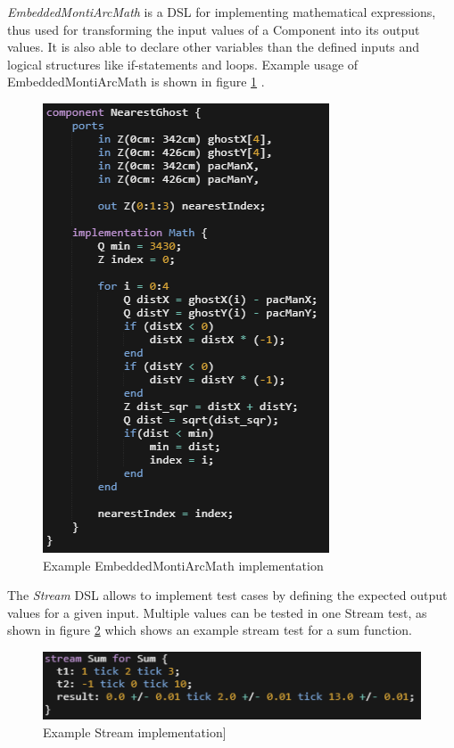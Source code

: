 \emph{EmbeddedMontiArcMath} is a DSL for implementing mathematical expressions, thus used for transforming the input values of a Component into its output values. It is also able to declare other variables than the defined inputs and logical structures like if-statements and loops. Example usage of EmbeddedMontiArcMath is shown in figure \ref{fig:EMontiArcMath} .

\begin{figure}[!h]
	\centering
	\includegraphics[scale=0.55]{pictures/EMAMath.PNG}
	\caption{Example EmbeddedMontiArcMath implementation}
	\label{fig:EMontiArcMath}
\end{figure}

The \emph{Stream} DSL allows to implement test cases by defining the expected output values for a given input. Multiple values can be tested in one Stream test, as shown in figure \ref{fig:EMAStream} which shows an example stream test for a sum function.

\begin{figure}[!h]
	\centering
	\includegraphics[scale=0.55]{pictures/EMAStream.PNG}
	\caption{Example Stream implementation]}
	\label{fig:EMAStream}
\end{figure}



